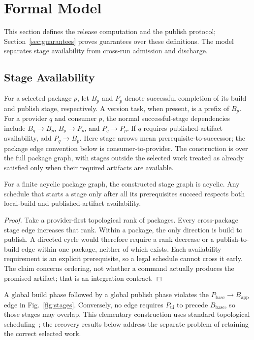 \section{Formal Model}
\label{sec:model}

This section defines the release computation and the publish protocol;
Section~\ref{sec:guarantees} proves guarantees over these definitions.
The model separates stage availability from cross-run admission and discharge.


\subsection{Stage Availability}
For a selected package $p$, let $B_p$ and $P_p$ denote successful completion
of its build and publish stage, respectively. A version task, when present,
is a prefix of $B_p$. For a provider $q$ and consumer $p$, the normal
successful-stage dependencies include $B_q\to B_p$, $B_p\to P_p$, and
$P_q\to P_p$. If $q$ requires published-artifact availability, add
$P_q\to B_p$. Here stage arrows mean prerequisite-to-successor; the package
edge convention below is consumer-to-provider. The construction is over the
full package graph, with stages outside the selected work treated as already
satisfied only when their required artifacts are available.

\begin{proposition}
\label{prop:stages}
For a finite acyclic package graph, the constructed stage graph is acyclic.
Any schedule that starts a stage only after all its prerequisites succeed
respects both local-build and published-artifact availability.
\end{proposition}
\begin{proof}
Take a provider-first topological rank of packages. Every cross-package stage
edge increases that rank. Within a package, the only direction is build to
publish. A directed cycle would therefore require a rank decrease or a
publish-to-build edge within one package, neither of which exists. Each
availability requirement is an explicit prerequisite, so a legal schedule
cannot cross it early. The claim concerns ordering, not whether a command
actually produces the promised artifact; that is an integration contract.
\end{proof}

A global build phase followed by a global publish phase violates the
$P_{\mathrm{base}}\to B_{\mathrm{app}}$ edge in Fig.~\ref{fig:stages}.
Conversely, no edge requires $P_{\mathrm{ui}}$ to precede
$B_{\mathrm{base}}$, so those stages may overlap. This elementary construction
uses standard topological scheduling~\cite{kahn,mokhov}; the recovery results
below address the separate problem of retaining the correct selected work.

